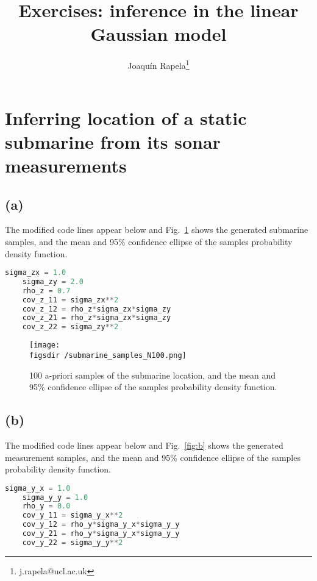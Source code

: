 \documentclass[12pt]{article}
\def\figsdir{../../../../../../code/scripts/probability/multivariateGaussians/inferenceInTheLinearGaussianModel/figures/}
\begin{document}
\title{Exercises: inference in the linear Gaussian model}
\author{Joaqu\'{i}n Rapela\thanks{j.rapela@ucl.ac.uk}}

\maketitle

\section{Inferring location of a static submarine from its sonar
measurements}

\subsection*{(a)} The modified code lines appear below and Fig.~\ref{fig:a}
shows the generated submarine samples, and the mean and 95\% confidence ellipse
of the samples probability density function.

\begin{lstlisting}[language=Python]
    sigma_zx = 1.0
    sigma_zy = 2.0
    rho_z = 0.7
    cov_z_11 = sigma_zx**2
    cov_z_12 = rho_z*sigma_zx*sigma_zy
    cov_z_21 = rho_z*sigma_zx*sigma_zy
    cov_z_22 = sigma_zy**2
\end{lstlisting}

\begin{center}
    \begin{figure}[H]
        \texttt{[image: \\figsdir /submarine\_samples\_N100.png]}
        \caption{100 a-priori samples of the submarine location, and the mean
        and 95\% confidence ellipse of the samples probability density
        function.}
        \label{fig:a}
    \end{figure}
\end{center}

\subsection*{(b)} The modified code lines appear below and Fig.~\ref{fig:b}
shows the generated measurement samples, and the mean and 95\% confidence
ellipse of the samples probability density function.

\begin{lstlisting}[language=Python]
    sigma_y_x = 1.0
    sigma_y_y = 1.0
    rho_y = 0.0
    cov_y_11 = sigma_y_x**2
    cov_y_12 = rho_y*sigma_y_x*sigma_y_y
    cov_y_21 = rho_y*sigma_y_x*sigma_y_y
    cov_y_22 = sigma_y_y**2
\end{lstlisting}
\end{document}
